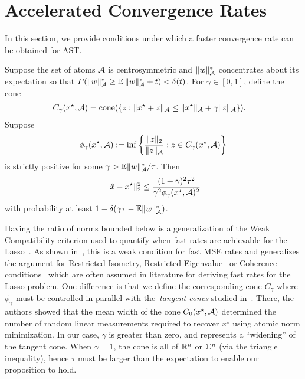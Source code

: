 \section{Accelerated Convergence Rates} %
\label{sec:convergence-rate}
In this section, we provide conditions under which a faster convergence rate
can be obtained for AST.
\begin{prop}
Suppose the set of atoms $\mathcal{A}$ is centrosymmetric and $\lVert w\rVert_{\mathcal{A}}^*$
concentrates about its expectation so that $P( {\lVert w\rVert_{\mathcal{A}}^*} \geq
\operatorname{\mathbb{E}}{\lVert w\rVert_{\mathcal{A}}^*}+t) < \delta(t)$. For $\gamma \in [0, 1]$, define the cone
\begin{align*}
C_\gamma(x^\star,\mathcal{A}) &= \operatorname{cone}(\{z:\lVert x^\star+ z\rVert_{\mathcal{A}} \leq \lVert x^\star\rVert_{\mathcal{A}} + \gamma\lVert z\rVert_{\mathcal{A}}\}).
\end{align*}
Suppose 
\begin{equation}
\label{eq:compatibility}
\phi_\gamma(x^\star,\mathcal{A}) := \inf \left\{ \frac{\lVert z\rVert_{2}}{\lVert z\rVert_{\mathcal{A}}}  : z \in C_\gamma(x^\star,\mathcal{A}) \right\} 
\end{equation}
is strictly positive for some $\gamma > {\operatorname{\mathbb{E}}\lVert w\rVert_{\mathcal{A}}^*}/{\tau}$. Then
\begin{equation}
\label{eq:fast_rate_phi}
\lVert\hat{x}-x^\star\rVert_2^2  \leq \frac{(1+\gamma)^2 \tau^2}{\gamma^2 \phi_\gamma(x^\star,\mathcal{A})^2}
\end{equation}
with probability at least $1-\delta(\gamma\tau - \operatorname{\mathbb{E}}\lVert w\rVert_{\mathcal{A}}^*)$.
\end{prop}

Having the ratio of norms bounded below is a generalization of the Weak
Compatibility criterion used to quantify when fast rates are achievable for the
Lasso~\cite{degeer}. As shown in~\cite{degeer}, this is a weak condition for
fast MSE rates and generalizes the argument for Restricted
Isometry\cite{candes06}, Restricted Eigenvalue~\cite{rest_eig} or Coherence
conditions~\cite{coherence} which are often assumed in literature for deriving
fast rates for the Lasso problem. One difference is that we define the
corresponding cone $C_\gamma$ where $\phi_\gamma$ must be controlled in parallel
with the~\emph{tangent cones} studied in~\cite{crpw}. There, the authors showed
that the mean width of the cone $C_0(x^\star,\mathcal{A})$ determined the number of
random linear measurements required to recover $x^\star$ using atomic norm
minimization. In our case, $\gamma$ is greater than zero, and represents a
``widening'' of the tangent cone. When $\gamma=1$, the cone is all of $\mathbb{R}^n$ or
$\mathbb{C}^n$ (via the triangle inequality), hence $\tau$ must be larger than the
expectation to enable our proposition to hold.

